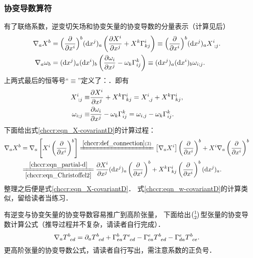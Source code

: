 \subsubsection{协变导数算符}
有了联络系数，逆变切矢场和协变矢量的协变导数的分量表示（计算见后）
\begin{align}
    \nabla_a X^b & = \Bigl(\frac{\partial}{\partial x^i}\Bigr)^b ({\rm d}x^j)_a
    \left(\frac{\partial X^i}{\partial x^j} +X^k \Gamma_{kj}^i \right)
    \equiv \Bigl(\frac{\partial}{\partial x^i}\Bigr)^b ({\rm d}x^j)_a  X^i_{\hphantom{i};j}  .
    \label{chccr:eqn_X-covariantD} \\
    \nabla_a \omega_b & = ({\rm d}x^j)_a  ({\rm d}x^i)_b \left(\frac{\partial \omega_i}{\partial x^j}
    -\omega_k \Gamma_{ij}^k \right) \equiv({\rm d}x^j)_a  ({\rm d}x^i)_b  \omega_{i;j} .
    \label{chccr:eqn_w-covariantD}
\end{align}
上两式最后的恒等号“$\equiv$”定义了：．即有
\begin{align}
    X^i_{\hphantom{i};j} \equiv& \frac{\partial X^i}{\partial x^j} +X^k \Gamma_{kj}^i
       =X^i_{\hphantom{i}, j} +X^k \Gamma_{kj}^i, \\
    \omega_{i;j} \equiv& \frac{\partial \omega_i}{\partial x^j} -\omega_k \Gamma_{ij}^k
       =\omega_{i,j} -\omega_k \Gamma_{ij}^k .
\end{align}
下面给出式\eqref{chccr:eqn_X-covariantD}的计算过程：
\begin{equation}
\begin{aligned}
    \nabla_a X^b & = \nabla_a \left[X^i \left(\frac{\partial }{\partial x^i}\right) ^b \right]
    \xlongequal{\ref{chccr:def_connection} (3)}
    \left[\nabla_a X^i\right] \left(\frac{\partial }{\partial x^i}\right) ^b
      +X^i \nabla_a \left(\frac{\partial }{\partial x^i}\right) ^b \\
    & \xlongequal[\ref{chccr:eqn_Christoffel2}]{\ref{chccr:eqn_partial-d}}
    \frac{\partial X^i}{\partial x^j}({\rm d}x^j)_a \left(\frac{\partial }{\partial x^i}\right) ^b
      +X^k \Gamma^{i}_{kj} \left(\frac{\partial }{\partial x^i}\right) ^b ({\rm d} x^j)_a  .
\end{aligned}
\end{equation}
整理之后便是式\eqref{chccr:eqn_X-covariantD}．
式\eqref{chccr:eqn_w-covariantD}的计算类似，留给读者当练习．

有逆变与协变矢量的协变导数容易推广到高阶张量，
下面给出$\binom{1}{2}$型张量的协变导数计算公式（推导过程并不复杂，请读者自行完成）．
\begin{equation}\label{chccr:eqn_T-covariantD}
    \nabla_a T^b_{\hphantom{a} cd} = \partial_a T^b_{\hphantom{a} cd} + \Gamma^b_{ea} T^e_{\hphantom{a}  cd}
     -\Gamma^e_{ca} T^b_{\hphantom{a} ed} -\Gamma^e_{da} T^b_{\hphantom{a} ce} .
\end{equation}
更高阶张量的协变导数公式，请读者自行写出，需注意系数的正负号．

